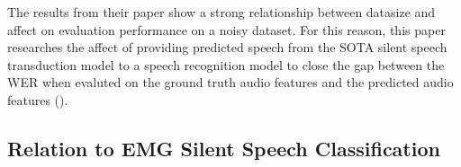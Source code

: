 The results from their paper show a strong relationship between datasize and
affect on evaluation performance on a noisy dataset. For this reason, this paper
researches the affect of providing predicted speech from the SOTA silent speech
transduction model to a speech recognition model to close the gap between
the WER when evaluted on the ground truth audio features and the predicted
audio features (\cite{DS2_original}).

\subsection{Relation to EMG Silent Speech Classification}

